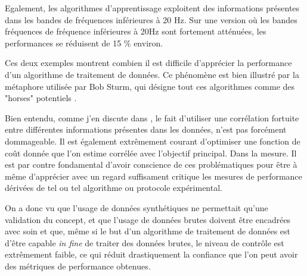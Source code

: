 Egalement, les algorithmes d'apprentissage exploitent des informations présentes dans les bandes de fréquences inférieures à 20 Hz. Sur une version où les bandes fréquences de fréquence inférieures à 20Hz sont fortement atténuées, les performances se réduisent de 15 \% environ.

Ces deux exemples montrent combien il est difficile d'apprécier la performance d'un algorithme de traitement de données. Ce phénomène est bien illustré par la métaphore utilisée par Bob Sturm, qui désigne tout ces algorithmes comme des "horses" potentiels .

Bien entendu, comme j'en discute dans \cite{}, le fait d'utiliser une corrélation fortuite entre différentes informations présentes dans les données, n'est pas forcément dommageable. Il est également extrêmement courant d'optimiser une fonction de coût donnée que l'on estime corrélée avec l'objectif principal. Dans la mesure. Il est par contre fondamental d'avoir conscience de ces problématiques pour être à même d'apprécier avec un regard suffisament critique les mesures de performance dérivées de tel ou tel algorithme ou protocole expérimental.

On a donc vu que l'usage de données synthétiques ne permettait qu'une validation du concept, et que l'usage de données brutes doivent être encadrées avec soin et que, même si le but d'un algorithme de traitement de données est d'être capable \textit{in fine} de traiter des données brutes, le niveau de contrôle est extrêmement faible, ce qui réduit drastiquement la confiance que l'on peut avoir des métriques de performance obtenues.

